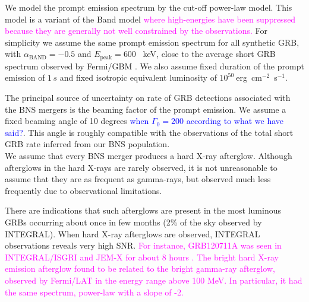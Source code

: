 \documentclass[11pt]{article}
\begin{document}
We model the prompt emission spectrum by the cut-off power-law model. This
model is a variant of the Band model \citep{1993ApJ...413..281B} \textcolor{magenta}{where high-energies have
been suppressed because they are generally not well constrained by the
observations.} For simplicity we assume the same prompt emission spectrum
for all synthetic GRB, with $\alpha_{\mathrm{BAND}} = - 0.5$ and
$E_{\mathrm{peak}} = 600$ \, keV, close to the average short GRB spectrum
observed by Fermi/GBM \citep{2014ApJS..211...12G}.   
We also assume
fixed duration of the prompt emission of $1 \, s$ and fixed isotropic equivalent
luminosity of $10^{50}~$erg~cm$^{-2}$~s$^{-1}$.

The principal source of uncertainty on rate of GRB detections associated with
the BNS mergers is the beaming factor of the prompt emission. We assume a fixed
beaming angle of 10 degrees \textcolor{blue}{when $\Gamma_{0} = 200$ according to what we have said?}. This angle is roughly compatible with the
observations of the total short GRB rate inferred from our BNS population. \\


We assume that every BNS merger produces a hard X-ray afterglow. Although
afterglows in the hard X-rays are rarely observed, it is not unreasonable to
assume that they are as frequent as gamma-rays, but observed much less
frequently due to observational limitations.

There are indications that such afterglows are present in the most luminous GRBs
occurring about once in few months (2\% of the sky observed by INTEGRAL).  When
hard X-ray afterglows are observed, INTEGRAL observations reveals very high
SNR. \textcolor{magenta}{For instance, GRB120711A was seen in INTEGRAL/ISGRI and JEM-X for about 8
hours \citep{2014A&A...567A..84M}. The bright hard X-ray emission afterglow found to
be related to the bright gamma-ray afterglow, observed by Fermi/LAT in the
energy range above 100 MeV. In particular, it had the same spectrum, power-law
with a slope of -2.}
\end{document}

